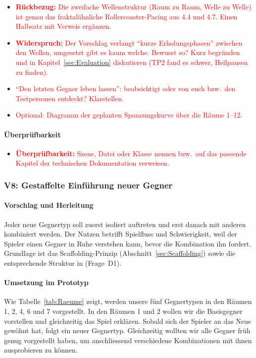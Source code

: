 \documentclass[../Main.tex]{subfiles}
\begin{document}
\begin{itemize}[leftmargin=1.5cm]
    \item \textcolor{red}{\textbf{Rückbezug:} Die zweifache Wellenstruktur (Raum zu Raum, Welle zu Welle) ist genau das fraktalähnliche Rollercoaster-Pacing aus 4.4 und 4.7. Einen Halbsatz mit Verweis ergänzen.}
    \item \textcolor{red}{\textbf{Widerspruch:} Der Vorschlag verlangt \enquote{kurze Erholungsphasen} zwischen den Wellen, umgesetzt gibt es kaum welche. Bewusst so? Kurz begründen und in Kapitel~\ref{sec:Evaluation} diskutieren (TP2 fand es schwer, Heilpausen zu finden).}
    \item \textcolor{red}{\enquote{Den letzten Gegner leben lassen}: beabsichtigt oder von euch bzw.\ den Testpersonen entdeckt? Klarstellen.}
    \item \textcolor{red}{Optional: Diagramm der geplanten Spannungskurve über die Räume 1--12.}
\end{itemize}

\paragraph{Überprüfbarkeit}
\begin{itemize}[leftmargin=1.5cm]
    \item \textcolor{red}{\textbf{Überprüfbarkeit:} Szene, Datei oder Klasse nennen bzw.\ auf das passende Kapitel der technischen Dokumentation verweisen.}
\end{itemize}

\subsubsection{V8: Gestaffelte Einführung neuer Gegner} \label{sec:V8}

\paragraph{Vorschlag und Herleitung}
Jeder neue Gegnertyp soll zuerst isoliert auftreten und erst danach mit anderen kombiniert werden. Der Nutzen betrifft Spielfluss und Schwierigkeit, weil der Spieler einen Gegner in Ruhe verstehen kann, bevor die Kombination ihn fordert. Grundlage ist das Scaffolding-Prinzip (Abschnitt~\ref{sec:Scaffolding}) sowie die entsprechende Struktur in  (Frage~D1).

\paragraph{Umsetzung im Prototyp}
Wie Tabelle~\ref{tab:Raeume} zeigt, werden unsere fünf Gegnertypen in den Räumen 1, 2, 4, 6 und 7 vorgestellt. In den Räumen 1 und 2 wollen wir die Basisgegner vorstellen und gleichzeitig das Spiel erklären. Sobald sich der Spieler an das Neue gewöhnt hat, folgt ein neuer Gegnertyp. Gleichzeitig wollten wir alle Gegner früh genug vorgestellt haben, um anschliessend verschiedene Kombinationen mit ihnen ausprobieren zu können.
\end{document}
